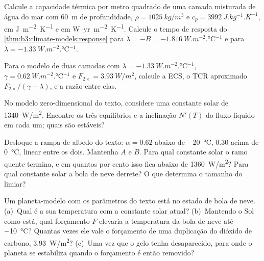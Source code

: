 \begin{exercise}[$\star$]\label{exo:b3:climate-models:3}
Calcule a capacidade térmica por metro quadrado de uma camada misturada de água do mar
com \qty{60}{m} de profundidade, $\rho = \qty{1025}{kg/m^3}$ e $c_p = \qty{3992}{J.kg^{-1}.K^{-1}}$,
em \unit{J.m^{-2}.K^{-1}} e em \unit{W.yr.m^{-2}.K^{-1}}. Calcule o
tempo de resposta do \cref{thm:b3:climate-models:response} para $\lambda = -B =
\qty{-1.816}{W.m^{-2}.\celsius^{-1}}$ e para $\lambda =
\qty{-1.33}{W.m^{-2}.\celsius^{-1}}$.
\end{exercise}

\begin{exercise}[$\star$]\label{exo:b3:climate-models:4}
Para o modelo de duas camadas com $\lambda = \qty{-1.33}{W.m^{-2}.\celsius^{-1}}$,
$\gamma = \qty{0.62}{W.m^{-2}.\celsius^{-1}}$ e $F_{2\times} =
\qty{3.93}{W/m^2}$, calcule a ECS, o TCR aproximado $F_{2\times}/
(\gamma - \lambda)$, e a razão entre elas.
\end{exercise}

\begin{exercise}[$\star\star$]\label{exo:b3:climate-models:5}
No modelo zero-dimensional do texto, considere uma constante solar de
\qty{1340}{W/m^2}. Encontre os três equilíbrios e a inclinação $N'(T)$ do
fluxo líquido em cada um; quais são estáveis?
\end{exercise}

\begin{exercise}[$\star\star$]\label{exo:b3:climate-models:6}
Desloque a rampa de albedo do texto: $\alpha = 0.62$ abaixo de \qty{-20}{\celsius},
$0.30$ acima de \qty{0}{\celsius}, linear entre os dois. Mantenha $A$ e $B$. Para qual
constante solar o ramo quente termina, e em quantos por cento isso fica
abaixo de \qty{1360}{W/m^2}? Para qual constante solar a bola de neve derrete?
O que determina o tamanho do limiar?
\end{exercise}

\begin{exercise}[$\star\star$]\label{exo:b3:climate-models:7}
Um planeta-modelo com os parâmetros do texto está no estado de bola de neve.
(a)~Qual é a sua temperatura com a constante solar atual? (b)~Mantendo o Sol
como está, qual forçamento $F$ elevaria a temperatura da bola de neve até
\qty{-10}{\celsius}? Quantas vezes ele vale o forçamento de uma duplicação do
dióxido de carbono, \qty{3.93}{W/m^2}? (c)~Uma vez que o gelo tenha desaparecido, para onde o planeta
se estabiliza quando o forçamento é então removido?
\end{exercise}

